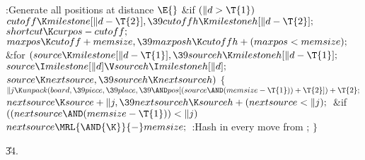 \B{}:Generate all positions at distance \X${}%
\E{}$\6
\&{if} ${}(\|d>\T{1}){}$\1\5
${}\\{cutoff}\K\\{milestone}[\|d-\T{2}],\39\\{cutoffh}\K\\{milestoneh}[\|d-%
\T{2}];{}$\2\6
${}\\{shortcut}\K\\{curpos}-\\{cutoff};{}$\6
${}\\{maxpos}\K\\{cutoff}+\\{memsize},\39\\{maxposh}\K\\{cutoffh}+(\\{maxpos}<%
\\{memsize});{}$\6
\&{for} ${}(\\{source}\K\\{milestone}[\|d-\T{1}],\39\\{sourceh}\K%
\\{milestoneh}[\|d-\T{1}];{}$ ${}\\{source}\I\\{milestone}[\|d]\V\\{sourceh}\I%
\\{milestoneh}[\|d];{}$ ${}\\{source}\K\\{nextsource},\39\\{sourceh}\K%
\\{nextsourceh}){}$\5
${}\{{}$\1\6
${}\|j\K\\{unpack}(\\{board},\39\\{piece},\39\\{place},\39{\AND}\\{pos}[(%
\\{source}\AND(\\{memsize}-\T{1}))+\T{2}])+\T{2};{}$\6
${}\\{nextsource}\K\\{source}+\|j,\39\\{nextsourceh}\K\\{sourceh}+(%
\\{nextsource}<\|j);{}$\6
\&{if} ${}((\\{nextsource}\AND(\\{memsize}-\T{1}))<\|j){}$\1\5
${}\\{nextsource}\MRL{\AND{\K}}{-}\\{memsize};{}$\2\6
:Hash in every move from \X;\6
\4${}\}{}$\2\par
\U34.\fi

